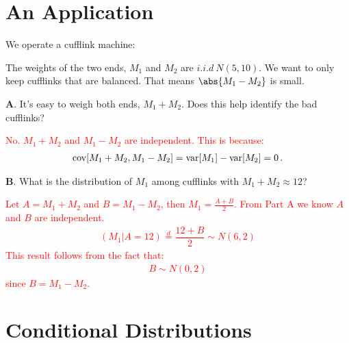 \documentclass[../../../Master/AppliedStochastics.tex]{subfiles}
\author{Chandler}
\date{03 October 2018}
\begin{document}
%


\makelecture


\section{An Application}

We operate a cufflink machine:


\begin{center}
\end{center}


The weights of the two ends,
    $M_1$ and $M_2$ are $i.i.d\ N(5,10)$.
We want to only keep cufflinks that are balanced. 
That means $\abs{M_{1} - M_{2}}$ is small.


\textbf{A}.
It's easy to weigh both ends, $M_{1}+M_{2}$. 
Does this help identify the bad cufflinks?


\textcolor{Red}{
    No.
    $M_{1}+M_{2}$ and $M_{1}-M_{2}$ are independent. 
	This is because: 
	$$\begin{aligned}
	   \operatorname{cov} [M_{1}+M_{2}, M_{1}-M_{2}] = \operatorname{var} [M_{1}]-\operatorname{var} [M_{2}] = 0\,.
	\end{aligned}$$}

\textbf{B}.
What is the distribution of $M_{1}$ among cufflinks with
    $M_{1}+M_{2}\approx 12$? 

\textcolor{Red}{
    Let $A=M_{1}+M_{2}$ and $B=M_{1}-M_{2}$, then $M_{1}=\frac{A+B}{2}$.
    From Part A we know $A$ and $B$ are independent.
	$$\begin{aligned}
	   (M_{1}\vert A=12) \stackrel{d}{=} \dfrac{12 + B}{2} \sim N(6,2)
	\end{aligned}$$
	This result follows from the fact that: 
	$$\begin{aligned}
	   B \sim N(0,2)
	\end{aligned}$$ 
	   since $B=M_{1}-M_{2}$.}


\section{Conditional Distributions}
\end{document}
